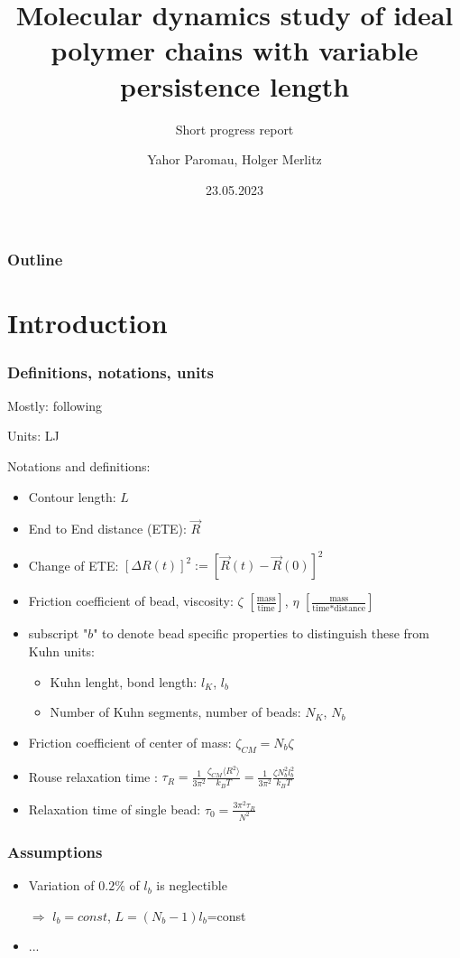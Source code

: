 \documentclass[handout]{beamer}
\title{Molecular dynamics study of ideal polymer chains with variable persistence length}
\subtitle{Short progress report}
\author{Yahor Paromau, Holger Merlitz}
\institute{ITP@IPF}
\date{23.05.2023}
\newcommand{\mean}[1]{\langle #1 \rangle}
\begin{document}
\begin{frame}
    \titlepage
\end{frame}


\begin{frame}
    \frametitle{Outline}
    \tableofcontents
\end{frame}

\section{Introduction}

\begin{frame}
    \frametitle{Definitions, notations, units}
    Mostly: following \cite{svaneborg_2020}

    Units: LJ

    Notations and definitions:

    \begin{itemize}
        \item Contour length: $L$
        \item End to End distance (ETE): $\vec{R}$
        \item Change of ETE: $[\Delta R(t)]^2 := [\vec{R}(t)-\vec{R}(0)]^2$
        \item Friction coefficient of bead, viscosity: $\zeta$ $[\frac{\textrm{mass}}{\textrm{time}}]$, $\eta$ $[\frac{\textrm{mass}}{\textrm{time} * \textrm{distance}}]$
        \item subscript "$b$" to denote bead speciﬁc properties to distinguish these from Kuhn units:
            \begin{itemize}
                \item Kuhn lenght, bond length: $l_K$, $l_b$
                \item Number of Kuhn segments, number of beads: $N_K$, $N_b$
            \end{itemize}
        \item Friction coefficient of center of mass: $\zeta_{CM}=N_b \zeta$ 
        \item Rouse relaxation time \cite{svaneborg_2020}: $\tau_R = \frac{1}{3 \pi^2} \frac{\zeta_{CM} \mean{R^2}}{k_B T} = \frac{1}{3 \pi^2} \frac{\zeta N_b^2 l_b^2}{k_B T}$
        \item Relaxation time of single bead: $\tau_0 = \frac{3\pi^2 \tau_R}{N^2}$ 
    \end{itemize}

\end{frame}
    

\begin{frame}
    \frametitle{Assumptions}
    \begin{itemize}
        \item Variation of $0.2\%$ of $l_b$ is neglectible \cite{svaneborg_2020} 
        
        $\Rightarrow$ $l_b=const$, $L=(N_b-1) l_b$=const

        \item ...
    \end{itemize} 
\end{frame}
\end{document}
